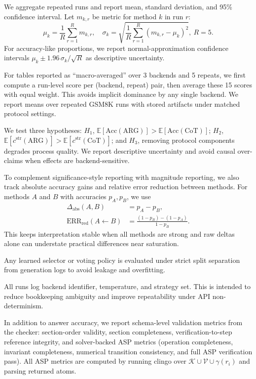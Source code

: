 \documentclass{article}
\begin{document}
We aggregate repeated runs and report mean, standard deviation, and 95\% confidence interval. Let \(m_{k,r}\) be metric for method \(k\) in run \(r\):
\begin{equation}
\label{eq:run-aggregation}
\mu_k=\frac{1}{R}\sum_{r=1}^{R}m_{k,r},\quad
\sigma_k=\sqrt{\frac{1}{R}\sum_{r=1}^{R}(m_{k,r}-\mu_k)^2},\ R=5.
\end{equation}
For accuracy-like proportions, we report normal-approximation confidence intervals
\(
\mu_k \pm 1.96\,\sigma_k/\sqrt{R}
\)
as descriptive uncertainty.

For tables reported as ``macro-averaged'' over 3 backends and 5 repeats, we first compute a run-level score per (backend, repeat) pair, then average these 15 scores with equal weight. This avoids implicit dominance by any single backend.
We report means over repeated GSM8K runs with stored artifacts under matched protocol settings.

We test three hypotheses: \(H_1\), \(\mathbb{E}[\mathrm{Acc}(\mathrm{ARG})] > \mathbb{E}[\mathrm{Acc}(\mathrm{CoT})]\); \(H_2\), \(\mathbb{E}[c^{\mathrm{str}}(\mathrm{ARG})] > \mathbb{E}[c^{\mathrm{str}}(\mathrm{CoT})]\); and \(H_3\), removing protocol components degrades process quality.
We report descriptive uncertainty and avoid causal over-claims when effects are backend-sensitive.

To complement significance-style reporting with magnitude reporting, we also track absolute accuracy gains and relative error reduction between methods. For methods \(A\) and \(B\) with accuracies \(p_A,p_B\), we use
\begin{equation}
\label{eq:effect-size}
\begin{aligned}
\Delta_{\mathrm{abs}}(A,B)&=p_A-p_B,\\
\mathrm{ERR}_{\mathrm{red}}(A\leftarrow B)&=\frac{(1-p_B)-(1-p_A)}{1-p_B}.
\end{aligned}
\end{equation}
This keeps interpretation stable when all methods are strong and raw deltas alone can understate practical differences near saturation.

Any learned selector or voting policy is evaluated under strict split separation from generation logs to avoid leakage and overfitting.

All runs log backend identifier, temperature, and strategy set. This is intended to reduce bookkeeping ambiguity and improve repeatability under API non-determinism.

In addition to answer accuracy, we report schema-level validation metrics from the checker: section-order validity, section completeness, verification-to-step reference integrity, and solver-backed ASP metrics (operation completeness, invariant completeness, numerical transition consistency, and full ASP verification pass). All ASP metrics are computed by running clingo over \(\mathcal{K}\cup\mathcal{V}\cup\gamma(r_i)\) and parsing returned atoms.
\end{document}

